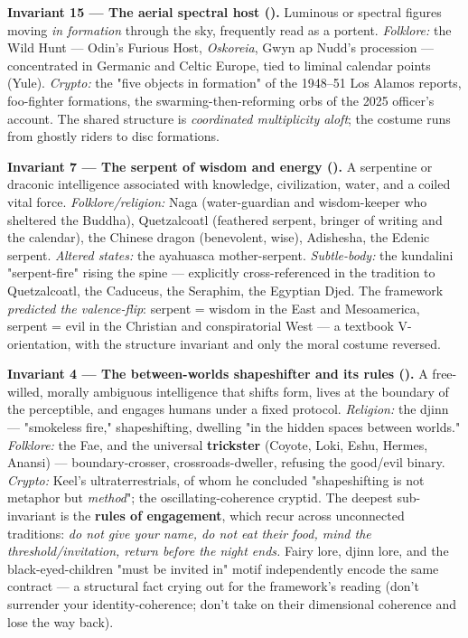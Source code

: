 \documentclass[11pt]{article}
\begin{document}
\textbf{Invariant 15 --- The aerial spectral host (\CIRCLE).} Luminous or spectral figures moving \emph{in formation} through the sky, frequently read as a portent. \emph{Folklore:} the Wild Hunt --- Odin's Furious Host, \emph{Oskoreia}, Gwyn ap Nudd's procession --- concentrated in Germanic and Celtic Europe, tied to liminal calendar points (Yule). \emph{Crypto:} the "five objects in formation" of the 1948--51 Los Alamos reports, foo-fighter formations, the swarming-then-reforming orbs of the 2025 officer's account. The shared structure is \emph{coordinated multiplicity aloft}; the costume runs from ghostly riders to disc formations.

\textbf{Invariant 7 --- The serpent of wisdom and energy (\CIRCLE).} A serpentine or draconic intelligence associated with knowledge, civilization, water, and a coiled vital force. \emph{Folklore/religion:} Naga (water-guardian and wisdom-keeper who sheltered the Buddha), Quetzalcoatl (feathered serpent, bringer of writing and the calendar), the Chinese dragon (benevolent, wise), Adishesha, the Edenic serpent. \emph{Altered states:} the ayahuasca mother-serpent. \emph{Subtle-body:} the kundalini "serpent-fire" rising the spine --- explicitly cross-referenced in the tradition to Quetzalcoatl, the Caduceus, the Seraphim, the Egyptian Djed. The framework \emph{predicted the valence-flip}: serpent = wisdom in the East and Mesoamerica, serpent = evil in the Christian and conspiratorial West --- a textbook V-orientation, with the structure invariant and only the moral costume reversed.

\textbf{Invariant 4 --- The between-worlds shapeshifter and its rules (\CIRCLE).} A free-willed, morally ambiguous intelligence that shifts form, lives at the boundary of the perceptible, and engages humans under a fixed protocol. \emph{Religion:} the djinn --- "smokeless fire," shapeshifting, dwelling "in the hidden spaces between worlds." \emph{Folklore:} the Fae, and the universal \textbf{trickster} (Coyote, Loki, Eshu, Hermes, Anansi) --- boundary-crosser, crossroads-dweller, refusing the good/evil binary. \emph{Crypto:} Keel's ultraterrestrials, of whom he concluded "shapeshifting is not metaphor but \emph{method}"; the oscillating-coherence cryptid. The deepest sub-invariant is the \textbf{rules of engagement}, which recur across unconnected traditions: \emph{do not give your name, do not eat their food, mind the threshold/invitation, return before the night ends.} Fairy lore, djinn lore, and the black-eyed-children "must be invited in" motif independently encode the same contract --- a structural fact crying out for the framework's reading (don't surrender your identity-coherence; don't take on their dimensional coherence and lose the way back).
\end{document}
